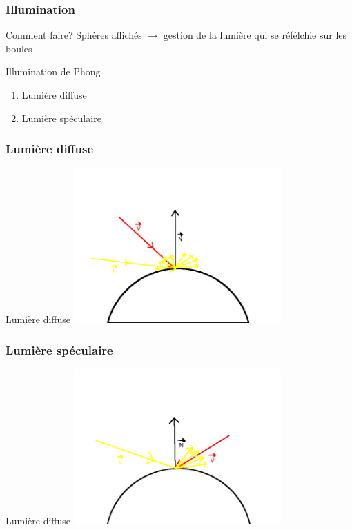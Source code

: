 \begin{frame}
	\frametitle{Illumination}
	\begin{block}{Comment faire?}
		Sphères affichés $\rightarrow$ gestion de la lumière qui se réfélchie sur les boules
	\end{block}
	\begin{block}{Illumination de Phong}
		\begin{enumerate}
			\item Lumière diffuse
			\item Lumière spéculaire
		\end{enumerate}
	\end{block}
\end{frame}
	
\begin{frame}
	\frametitle{Lumière diffuse}
	\begin{block}{Lumière diffuse}
		\includegraphics[width = 300px]{phong1.png} 
	\end{block}
\end{frame}
	
\begin{frame}
	\frametitle{Lumière spéculaire}
	\begin{block}{Lumière diffuse}
		\includegraphics[width = 300px]{phong2.png} 
	\end{block}
\end{frame}

